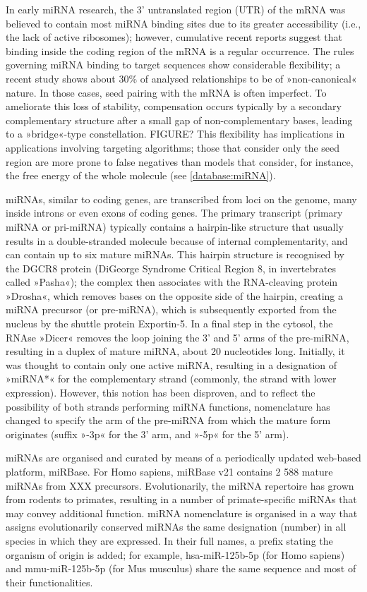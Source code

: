 In early miRNA research, the 3' untranslated region (UTR) of the mRNA was believed to contain most miRNA binding sites due to its greater accessibility (i.e., the lack of active ribosomes); however, cumulative recent reports suggest that binding inside the coding region of the mRNA is a regular occurrence\cite{}. The rules governing miRNA binding to target sequences show considerable flexibility; a recent study shows about 30\% of analysed relationships to be of »non-canonical« nature\cite{}. In those cases, seed pairing with the mRNA is often imperfect. To ameliorate this loss of stability, compensation occurs typically by a secondary complementary structure after a small gap of non-complementary bases, leading to a »bridge«-type constellation. FIGURE? This flexibility has implications in applications involving targeting algorithms; those that consider only the seed region are more prone to false negatives than models that consider, for instance, the free energy of the whole molecule (see \ref{database:miRNA}).

miRNAs, similar to coding genes, are transcribed from loci on the genome, many inside introns or even exons of coding genes\cite{Rodriguez2004}. The primary transcript (primary miRNA or pri-miRNA) typically contains a hairpin-like structure that usually results in a double-stranded molecule because of internal complementarity, and can contain up to six mature miRNAs. This hairpin structure is recognised by the DGCR8 protein (DiGeorge Syndrome Critical Region 8, in invertebrates called »Pasha«); the complex then associates with the RNA-cleaving protein »Drosha«, which removes bases on the opposite side of the hairpin, creating a miRNA precursor (or pre-miRNA), which is subsequently exported from the nucleus by the shuttle protein Exportin-5. In a final step in the cytosol, the RNAse »Dicer« removes the loop joining the 3' and 5' arms of the pre-miRNA, resulting in a duplex of mature miRNA, about 20 nucleotides long. Initially, it was thought to contain only one active miRNA, resulting in a designation of »miRNA*« for the complementary strand (commonly, the strand with lower expression). However, this notion has been disproven, and to reflect the possibility of both strands performing miRNA functions, nomenclature has changed to specify the arm of the pre-miRNA from which the mature form originates (suffix »-3p« for the 3' arm, and »-5p« for the 5' arm).

miRNAs are organised and curated by means of a periodically updated web-based platform, miRBase\cite{Kozomara2019}. For Homo sapiens, miRBase v21 contains 2 588 mature miRNAs from XXX precursors. Evolutionarily, the miRNA repertoire has grown from rodents to primates, resulting in a number of primate-specific miRNAs that may convey additional function. miRNA nomenclature is organised\cite{Ambros2003} in a way that assigns evolutionarily conserved miRNAs the same designation (number) in all species in which they are expressed. In their full names, a prefix stating the organism of origin is added; for example, hsa-miR-125b-5p (for Homo sapiens) and mmu-miR-125b-5p (for Mus musculus) share the same sequence and most of their functionalities.

